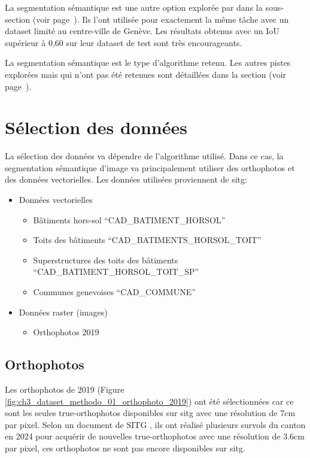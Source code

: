 La segmentation sémantique est une autre option explorée par \citeauthor{castello_quantification_2021} dans la sous-section \textit{} (voir page~\pageref{subsec:castello_quantification_2021}). Ils l'ont utilisée pour exactement la même tâche avec un dataset limité au centre-ville de Genève. Les résultats obtenus avec un IoU supérieur à 0,60 sur leur dataset de test sont très encourageants.

La segmentation sémantique est le type d'algorithme retenu. Les autres pistes explorées mais qui n'ont pas été retenues sont détaillées dans la section \textit{} (voir page~\pageref{sec:pistes_explorees}).

\section{Sélection des données}
La sélection des données va dépendre de l'algorithme utilisé. Dans ce cas, la segmentation sémantique d'image va principalement utiliser des orthophotos et des données vectorielles. Les données utilisées proviennent de \acrshort{sitg}:
\begin{itemize}
    \item Données vectorielles
    \begin{itemize}
        \item Bâtiments hors-sol ``CAD\_BATIMENT\_HORSOL'' \cite{sitg_batiments_nodate}
        \item Toits des bâtiments ``CAD\_BATIMENTS\_HORSOL\_TOIT'' \cite{sitg_toits_nodate}
        \item Superstructures des toits des bâtiments ``CAD\_BATIMENT\_HORSOL\_TOIT\_SP'' \cite{sitg_superstructures_nodate}
        \item Communes genevoises ``CAD\_COMMUNE'' \cite{sitg_communes_nodate}
    \end{itemize}
    \item Données raster (images)
    \begin{itemize}
        \item Orthophotos 2019 \cite{sitg_orthophotos_nodate}
    \end{itemize}
\end{itemize}

\subsection{Orthophotos}
Les orthophotos de 2019 (Figure \ref{fig:ch3_dataset_methodo_01_orthophoto_2019}) ont été sélectionnées car ce sont les seules true-orthophotos disponibles sur \acrshort{sitg} avec une résolution de 7cm par pixel. Selon un document de SITG \cite{etat_de_geneve_inventaire_2025}, ils ont réalisé plusieurs survols du canton en 2024 pour acquérir de nouvelles true-orthophotos avec une résolution de 3.6cm par pixel, ces orthophotos ne sont pas encore disponibles sur \acrshort{sitg}.

